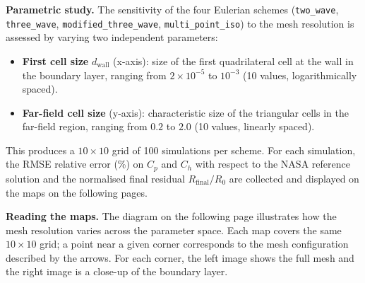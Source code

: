 \documentclass[a4paper]{article}
\begin{document}
\bigskip

\newpage

\noindent
\textbf{Parametric study.}
The sensitivity of the four Eulerian schemes (\texttt{two\_wave}, \texttt{three\_wave},
\texttt{modified\_three\_wave}, \texttt{multi\_point\_iso}) to the mesh resolution is
assessed by varying two independent parameters:
\begin{itemize}
  \item \textbf{First cell size} $d_\mathrm{wall}$ (x-axis): size of the first
        quadrilateral cell at the wall in the boundary layer, ranging from
        $2\times10^{-5}$ to $10^{-3}$ (10 values, logarithmically spaced).
  \item \textbf{Far-field cell size} (y-axis): characteristic size of the triangular
        cells in the far-field region, ranging from $0.2$ to $2.0$ (10 values,
        linearly spaced).
\end{itemize}
This produces a $10\times10$ grid of 100 simulations per scheme.
For each simulation, the RMSE relative error (\%) on $C_p$ and $C_h$ with respect to
the NASA reference solution and the normalised final residual $R_\mathrm{final}/R_0$
are collected and displayed on the maps on the following pages.

\bigskip

\noindent
\textbf{Reading the maps.}
The diagram on the following page illustrates how the mesh resolution varies across the
parameter space.
Each map covers the same $10\times10$ grid; a point near a given corner corresponds to
the mesh configuration described by the arrows.
For each corner, the left image shows the full mesh and the right image is a close-up
of the boundary layer.
\end{document}
